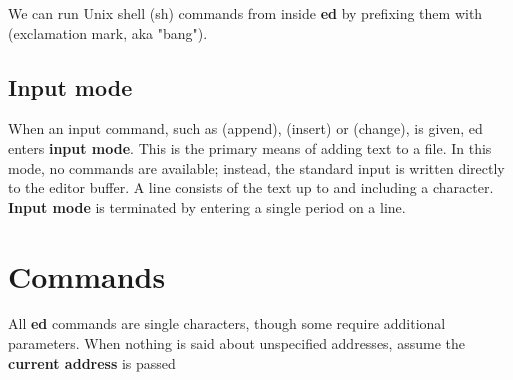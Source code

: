 \documentclass[a4paper,10pt]{article}
\begin{document}
We can run Unix shell (sh) commands from inside \textbf{ed} by prefixing them with  (exclamation mark, aka "bang").

\subsection{Input mode}\label{sec:input}

When an input command, such as  (append),  (insert) or 
(change), is given, ed enters \textbf{input mode}. This is the primary means of adding
text to a file. In this mode, no commands are available; instead, the standard
input is written directly to the editor buffer. A line consists of the text up
to and including a  character. \textbf{Input mode} is terminated by entering a
single period  on a line.

\section{Commands}

All \textbf{ed} commands are single characters, though some require additional
parameters. When nothing is said about unspecified addresses, assume the
\textbf{current address} is passed
\end{document}
